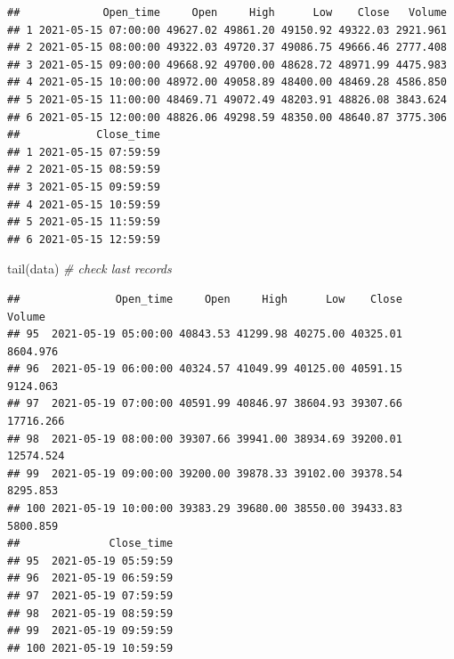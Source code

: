 \documentclass[
]{book}
\newenvironment{Shaded}{\begin{snugshade}}{\end{snugshade}}
\newcommand{\AttributeTok}[1]{\textcolor[rgb]{0.77,0.63,0.00}{#1}}
\newcommand{\CommentTok}[1]{\textcolor[rgb]{0.56,0.35,0.01}{\textit{#1}}}
\newcommand{\FloatTok}[1]{\textcolor[rgb]{0.00,0.00,0.81}{#1}}
\newcommand{\FunctionTok}[1]{\textcolor[rgb]{0.00,0.00,0.00}{#1}}
\newcommand{\NormalTok}[1]{#1}
\newcommand{\OtherTok}[1]{\textcolor[rgb]{0.56,0.35,0.01}{#1}}
\newcommand{\SpecialCharTok}[1]{\textcolor[rgb]{0.00,0.00,0.00}{#1}}
\newcommand{\StringTok}[1]{\textcolor[rgb]{0.31,0.60,0.02}{#1}}
\begin{document}
\begin{Shaded}
\end{Shaded}

\begin{verbatim}
##             Open_time     Open     High      Low    Close   Volume
## 1 2021-05-15 07:00:00 49627.02 49861.20 49150.92 49322.03 2921.961
## 2 2021-05-15 08:00:00 49322.03 49720.37 49086.75 49666.46 2777.408
## 3 2021-05-15 09:00:00 49668.92 49700.00 48628.72 48971.99 4475.983
## 4 2021-05-15 10:00:00 48972.00 49058.89 48400.00 48469.28 4586.850
## 5 2021-05-15 11:00:00 48469.71 49072.49 48203.91 48826.08 3843.624
## 6 2021-05-15 12:00:00 48826.06 49298.59 48350.00 48640.87 3775.306
##            Close_time
## 1 2021-05-15 07:59:59
## 2 2021-05-15 08:59:59
## 3 2021-05-15 09:59:59
## 4 2021-05-15 10:59:59
## 5 2021-05-15 11:59:59
## 6 2021-05-15 12:59:59
\end{verbatim}

\begin{Shaded}
\begin{Highlighting}[]
\FunctionTok{tail}\NormalTok{(data) }\CommentTok{\# check last records}
\end{Highlighting}
\end{Shaded}

\begin{verbatim}
##               Open_time     Open     High      Low    Close    Volume
## 95  2021-05-19 05:00:00 40843.53 41299.98 40275.00 40325.01  8604.976
## 96  2021-05-19 06:00:00 40324.57 41049.99 40125.00 40591.15  9124.063
## 97  2021-05-19 07:00:00 40591.99 40846.97 38604.93 39307.66 17716.266
## 98  2021-05-19 08:00:00 39307.66 39941.00 38934.69 39200.01 12574.524
## 99  2021-05-19 09:00:00 39200.00 39878.33 39102.00 39378.54  8295.853
## 100 2021-05-19 10:00:00 39383.29 39680.00 38550.00 39433.83  5800.859
##              Close_time
## 95  2021-05-19 05:59:59
## 96  2021-05-19 06:59:59
## 97  2021-05-19 07:59:59
## 98  2021-05-19 08:59:59
## 99  2021-05-19 09:59:59
## 100 2021-05-19 10:59:59
\end{verbatim}
\end{document}
